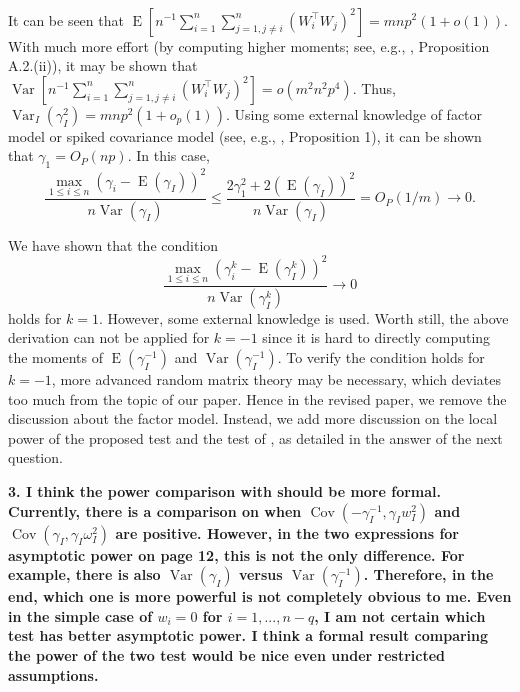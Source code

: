 \documentclass[11pt]{article}
\DeclareMathOperator{\myE}{E}
\DeclareMathOperator{\myVar}{Var}
\DeclareMathOperator{\myCov}{Cov}
\theoremstyle{plain}
\theoremstyle{definition}
\theoremstyle{remark}
\begin{document}
\begin{enumerate}[(a)]
\begin{align*}
            \end{align*}
            It can be seen that $\myE [n^{-1}\sum_{i=1}^n \sum_{j=1, j\neq i}^n (W_i^\top W_j)^2] = mnp^2(1+o(1))$.
            With much more effort (by computing higher moments; see, e.g., \cite{chen2010tests}, Proposition A.2.(ii)), it may be shown that $\myVar [n^{-1}\sum_{i=1}^n \sum_{j=1, j\neq i}^n (W_i^\top W_j)^2] = o(m^2 n^2 p^4)$.
            Thus, $\myVar_I (\gamma_I^2) = mnp^2(1+o_p(1))$.
            Using some external knowledge of factor model or spiked covariance model (see, e.g., \cite{Wang2021}, Proposition 1), it can be shown that $\gamma_1 = O_P(np)$.
            In this case,
            \begin{equation*}
                \frac{
                    \max_{1\leq i\leq n} (\gamma_i - \myE(\gamma_I))^2
                } {
                    n\myVar(\gamma_I)
                }
                \leq
                \frac{
                2\gamma_1^2 + 2(\myE(\gamma_I))^2
                } {
                    n\myVar(\gamma_I)
                }
                =O_P(1/m) \to 0.
            \end{equation*}
    \end{enumerate}
    We have shown that the condition
    \begin{equation*}
        \frac{\max_{1\leq i \leq n}(\gamma_i^k - \myE(\gamma_I^k))^2}{n \myVar (\gamma_I^k)} \to 0
    \end{equation*}
    holds for $k=1$.
    However, some external knowledge is used.
    Worth still, the above derivation can not be applied for $k=-1$ since it is hard to directly computing the moments of $\myE(\gamma_I^{-1})$ and $\myVar(\gamma_I^{-1})$.
    To verify the condition holds for $k=-1$, more advanced random matrix theory may be necessary, which deviates too much from the topic of our paper.
    Hence in the revised paper, we remove the discussion about the factor model.
    Instead, we add more discussion on the local power of the proposed test and the test of \cite{Goeman2006}, as detailed in the answer of the next question.

\textbf{
    3.
    I think the power comparison with \cite{Goeman2006} should be more formal.
    Currently, there is a comparison on when $\myCov(-\gamma_I^{-1}, \gamma_I w_I^2)$ and $\myCov(\gamma_I, \gamma_I \omega_I^2)$ are positive.
    However, in the two expressions for asymptotic power on page 12, this is not the only difference.
    For example, there is also $\myVar (\gamma_I)$ versus $\myVar(\gamma_I^{-1})$.
    Therefore, in the end, which one is more powerful is not completely obvious to me.
    Even in the simple case of $w_i = 0$ for $i = 1, ..., n-q$, I am not certain which test has better asymptotic power.
I think a formal result comparing the power of the two test would be nice
even under restricted assumptions.
}
\end{document}
